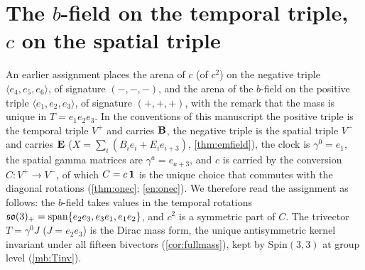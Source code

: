 
\section{\texorpdfstring{The $b$-field on the temporal triple, $c$ on the spatial triple}{The b-field on the temporal triple, c on the spatial triple}}
\label{e6:sec:main}

An earlier assignment places the arena of $c$ (of $c^2$) on the negative triple $\langle e_4,e_5,e_6\rangle$, of signature $(-,-,-)$, and the
arena of the $b$-field on the positive triple $\langle e_1,e_2,e_3\rangle$, of signature $(+,+,+)$, with the remark that the mass is unique in
$T=e_1e_2e_3$. In the conventions of this manuscript the positive triple is the temporal triple $V^+$ and carries $\mathbf B$, the negative triple is
the spatial triple $V^-$ and carries $\mathbf E$ ($X=\sum_i(B_ie_i+E_ie_{i+3})$, \cref{thm:emfield}), the clock is $\gamma^0=e_1$, the spatial
gamma matrices are $\gamma^a=e_{a+3}$, and $c$ is carried by the conversion $C\colon V^+\to V^-$, of which $C=c\,\mathbf 1$ is the unique choice that
commutes with the diagonal rotations (\cref{thm:onec}; \cref{en:onec}). We therefore read the assignment as follows:
the $b$-field takes values in the temporal rotations $\mathfrak{so}(3)_+=\operatorname{span}\{e_2e_3,e_3e_1,e_1e_2\}$, and $c^2$ is a symmetric part of $C$.
The trivector $T=\gamma^0J$ ($J=e_2e_3$) is the Dirac mass form, the unique antisymmetric kernel invariant under all fifteen bivectors
(\cref{cor:fullmass}), kept by $\mathrm{Spin}(3,3)$ at group level (\cref{mb:Tinv}).

